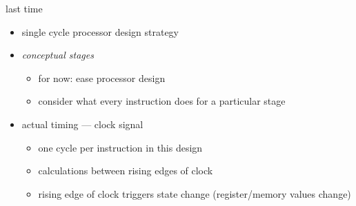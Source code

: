 \begin{frame}{last time}
    \begin{itemize}
    \item single cycle processor design strategy
    \item \textit{conceptual stages}
        \begin{itemize}
            \item for now: ease processor design
            \item consider what every instruction does for a particular stage
        \end{itemize}
    \item actual timing --- clock signal
        \begin{itemize}
        \item one cycle per instruction in this design
        \item calculations between rising edges of clock
        \item rising edge of clock triggers state change (register/memory values change)
        \end{itemize}
    \end{itemize}
\end{frame}
